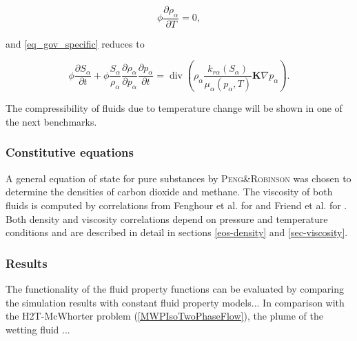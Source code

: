 \begin{equation}
\phi\frac{\partial \rho_\alpha}{\partial T}=0,
\label{eq_drho_dT}
\end{equation}

and \eqref{eq_gov_specific} reduces to 

\begin{equation}
\phi\frac{\partial S_\alpha}{\partial t}+\phi\frac{S_\alpha}{\rho_\alpha}\frac{\partial\rho_\alpha}{\partial p_\alpha}\frac{\partial p_\alpha}{\partial t} = \operatorname{div}\left(\rho_\alpha\frac{k_{r\alpha}\!\left(S_\alpha\right)}{\mu_\alpha\!\left(p_\alpha,T\right)}\mathbf{K}\nabla p_\alpha\right).
\label{eq_gov_specific_short}
\end{equation}


The compressibility of fluids due to temperature change will be shown in one of the next benchmarks.

\subsubsection*{Constitutive equations}

A general equation of state for pure substances by \textsc{Peng\&Robinson} \cite{PenRob:75} was chosen to determine the densities of carbon dioxide and methane. The viscosity of both fluids is computed by correlations from Fenghour et al. \cite{FenWakVes:98} for {} and Friend et al. \cite{FriElyIng:89} for {}. Both density and viscosity correlations depend on pressure and temperature conditions and are described in detail in sections \ref{eos-density} and \ref{sec-viscosity}.

\subsubsection*{Results}

The functionality of the fluid property functions can be evaluated by comparing the simulation results with constant fluid property models...
In comparison with the H2T-McWhorter problem (\ref{MWPIsoTwoPhaseFlow}), the plume of the wetting fluid ...




